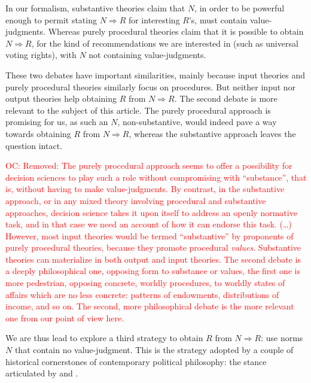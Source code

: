 \documentclass[preprint, french, english, 11pt, authoryear]{elsarticle}%
\newcommand{\commentOC}[1]{\textcolor{red}{OC: #1}}
\begin{document}
In our formalism, substantive theories claim that $N$, in order to be powerful enough to permit stating $N ⇒ R$ for interesting $R$’s, must contain value-judgments. Whereas purely procedural theories claim that it is possible to obtain $N ⇒ R$, for the kind of recommendations we are interested in (such as universal voting rights), with $N$ not containing value-judgments. 

These two debates have important similarities, mainly because input theories and purely procedural theories similarly focus on procedures.  But neither input nor output theories help obtaining $R$ from $N ⇒ R$. The second debate is more relevant to the subject of this article. The purely procedural approach is promising for us, as such an $N$, non-substantive, would indeed pave a way towards obtaining $R$ from $N ⇒ R$, whereas the substantive approach leaves the question intact.

\commentOC{Removed: The purely procedural approach seems to offer a possibility for decision sciences to play such a role without compromising with ``substance'', that is, without having to make value-judgments. By contrast, in the substantive approach, or in any mixed theory involving procedural and substantive approaches, decision science takes it upon itself to address an openly normative task, and in that case we need an account of how it can endorse this task. (…) However, most input theories would be termed ``substantive'' by proponents of purely procedural theories, because they promote procedural \emph{values}. Substantive theories can materialize in both output and input theories. The second debate is a deeply philosophical one, opposing form to substance or values, the first one is more pedestrian, opposing concrete, worldly procedures, to worldly states of affairs which are no less concrete: patterns of endowments, distributions of income, and so on. The second, more philosophical debate is the more relevant one from our point of view here.}

We are thus lead to explore a third strategy to obtain $R$ from $N ⇒ R$: use norms $N$ that contain no value-judgment. This is the strategy adopted by a couple of historical cornerstones of contemporary political philosophy: the stance articulated by \cite{rawls_political_2005} and \cite{habermas_moralbewustsein_1983}.
\end{document}
